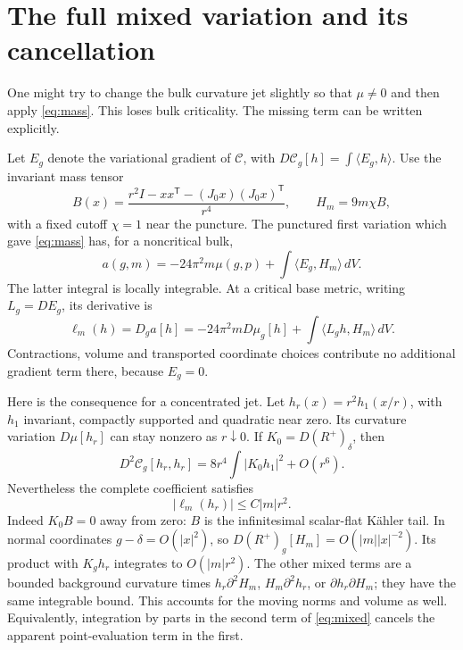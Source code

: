 \documentclass[11pt]{article}
\newcommand{\calC}{\mathcal C}
\begin{document}
\section{The full mixed variation and its cancellation}
One might try to change the bulk curvature jet slightly so that
$\mu\ne0$ and then apply \eqref{eq:mass}. This loses bulk criticality.
The missing term can be written explicitly.

Let $E_g$ denote the variational gradient of $\calC$, with
$D\calC_g[h]=\int\langle E_g,h\rangle$. Use the invariant mass tensor
\[
 B(x)=\frac{r^2I-xx^{\mathsf T}-(J_0x)(J_0x)^{\mathsf T}}{r^4},
 \qquad H_m=9m\chi B,
\]
with a fixed cutoff $\chi=1$ near the puncture. The punctured first
variation which gave \eqref{eq:mass} has, for a noncritical bulk,
\begin{equation}
 a(g,m)=-24\pi^2m\mu(g,p)+\int\langle E_g,H_m\rangle\,dV.
 \label{eq:noncritical}
\end{equation}
The latter integral is locally integrable. At a critical base metric,
writing $L_g=DE_g$, its derivative is
\begin{equation}
 \ell_m(h)=D_ga[h]=-24\pi^2mD\mu_g[h]
                         +\int\langle L_gh,H_m\rangle\,dV.
 \label{eq:mixed}
\end{equation}
Contractions, volume and transported coordinate choices contribute no
additional gradient term there, because $E_g=0$.

Here is the consequence for a concentrated jet. Let
$h_r(x)=r^2h_1(x/r)$, with $h_1$ invariant, compactly supported and
quadratic near zero. Its curvature variation $D\mu[h_r]$ can stay
nonzero as $r\downarrow0$. If $K_0=D(R^+)_\delta$, then
\[
 D^2\calC_g[h_r,h_r]
       =8r^4\int|K_0h_1|^2+O(r^6).
\]
Nevertheless the complete coefficient satisfies
\begin{equation}
 |\ell_m(h_r)|\le C|m|r^2.\label{eq:localbound}
\end{equation}
Indeed $K_0B=0$ away from zero: $B$ is the infinitesimal scalar-flat
K\"ahler tail. In normal coordinates $g-\delta=O(|x|^2)$, so
$D(R^+)_g[H_m]=O(|m||x|^{-2})$. Its product with $K_gh_r$ integrates
to $O(|m|r^2)$. The other mixed terms are a bounded background
curvature times $h_r\partial^2H_m$, $H_m\partial^2h_r$, or
$\partial h_r\partial H_m$; they have the same integrable bound.
This accounts for the moving norms and volume as well. Equivalently,
integration by parts in the second term of \eqref{eq:mixed} cancels
the apparent point-evaluation term in the first.
\end{document}
